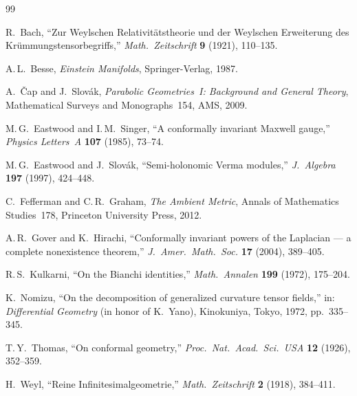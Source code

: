 \documentclass[11pt,a4paper]{article}
\begin{document}
\begin{thebibliography}{99}

R.~Bach,
``Zur Weylschen Relativit\"atstheorie und der Weylschen Erweiterung
des Kr\"ummungstensorbegriffs,''
\textit{Math.\ Zeitschrift} \textbf{9} (1921), 110--135.

A.\,L.~Besse,
\textit{Einstein Manifolds},
Springer-Verlag, 1987.

A.~\v{C}ap and J.~Slov\'ak,
\textit{Parabolic Geometries~I: Background and General Theory},
Mathematical Surveys and Monographs~154, AMS, 2009.

M.\,G.~Eastwood and I.\,M.~Singer,
``A conformally invariant Maxwell gauge,''
\textit{Physics Letters~A} \textbf{107} (1985), 73--74.

M.\,G.~Eastwood and J.~Slov\'ak,
``Semi-holonomic Verma modules,''
\textit{J.~Algebra} \textbf{197} (1997), 424--448.

C.~Fefferman and C.\,R.~Graham,
\textit{The Ambient Metric},
Annals of Mathematics Studies~178, Princeton University Press, 2012.

A.\,R.~Gover and K.~Hirachi,
``Conformally invariant powers of the Laplacian --- a complete
nonexistence theorem,''
\textit{J.~Amer.\ Math.\ Soc.} \textbf{17} (2004), 389--405.

R.\,S.~Kulkarni,
``On the Bianchi identities,''
\textit{Math.\ Annalen} \textbf{199} (1972), 175--204.

K.~Nomizu,
``On the decomposition of generalized curvature tensor fields,''
in: \textit{Differential Geometry} (in honor of K.~Yano),
Kinokuniya, Tokyo, 1972, pp.~335--345.

T.\,Y.~Thomas,
``On conformal geometry,''
\textit{Proc.\ Nat.\ Acad.\ Sci.\ USA} \textbf{12} (1926), 352--359.

H.~Weyl,
``Reine Infinitesimalgeometrie,''
\textit{Math.\ Zeitschrift} \textbf{2} (1918), 384--411.

\end{thebibliography}
\end{document}
